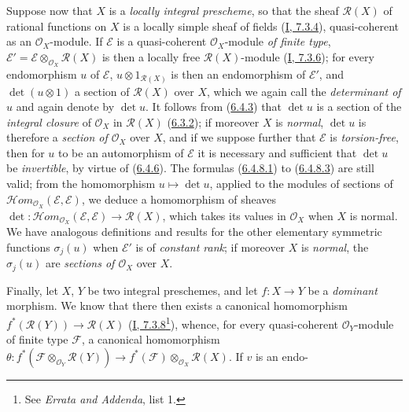 \begin{env}[6.4.9]
\label{II.6.4.9}
Suppose now that $X$ is a \emph{locally integral prescheme}, so that the
sheaf $\mathcal{R}(X)$ of rational functions on $X$ is a locally simple sheaf
of fields (\hyperref[I.7.3.4]{I, 7.3.4}), quasi-coherent as an
$\mathcal{O}_X$-module. If $\mathcal{E}$ is a quasi-coherent
$\mathcal{O}_X$-module \emph{of finite type},
$\mathcal{E}'=\mathcal{E}\otimes_{\mathcal{O}_X}\mathcal{R}(X)$ is then a
locally free $\mathcal{R}(X)$-module
(\hyperref[I.7.3.6]{I, 7.3.6}); for every endomorphism $u$ of
$\mathcal{E}$, $u\otimes1_{\mathcal{R}(X)}$ is then an endomorphism of
$\mathcal{E}'$, and $\det(u\otimes1)$ a section of $\mathcal{R}(X)$ over
$X$, which we again call the \emph{determinant of $u$} and again denote by
$\det u$. It follows from (\hyperref[II.6.4.3]{6.4.3}) that $\det u$ is
a section of the \emph{integral closure} of $\mathcal{O}_X$ in
$\mathcal{R}(X)$ (\hyperref[II.6.3.2]{6.3.2}); if moreover $X$ is
\emph{normal}, $\det u$ is therefore a \emph{section of $\mathcal{O}_X$}
over $X$, and if we suppose further that $\mathcal{E}$ is
\emph{torsion-free}, then for $u$ to be an automorphism of $\mathcal{E}$ it
is necessary and sufficient that $\det u$ be \emph{invertible}, by virtue of
(\hyperref[II.6.4.6]{6.4.6}). The formulas
(\hyperref[II.6.4.8.1]{6.4.8.1}) to
(\hyperref[II.6.4.8.3]{6.4.8.3}) are still valid; from the homomorphism
$u\mapsto\det u$, applied to the modules of sections of
$\mathcal{H}om_{\mathcal{O}_X}(\mathcal{E},\mathcal{E})$, we deduce a
homomorphism of sheaves
$\det:\mathcal{H}om_{\mathcal{O}_X}(\mathcal{E},\mathcal{E})
\to\mathcal{R}(X)$, which takes its values in $\mathcal{O}_X$ when $X$ is
normal. We have analogous definitions and results for the other elementary
symmetric functions $\sigma_j(u)$ when $\mathcal{E}'$ is of \emph{constant
rank}; if moreover $X$ is \emph{normal}, the $\sigma_j(u)$ are
\emph{sections of $\mathcal{O}_X$} over $X$.

Finally, let $X$, $Y$ be two integral preschemes, and let $f:X\to Y$ be a
\emph{dominant} morphism. We know that there then exists a canonical
homomorphism $f^*(\mathcal{R}(Y))\to\mathcal{R}(X)$
(\hyperref[I.7.3.8]{I, 7.3.8}\footnote{See \emph{Errata and Addenda},
list 1.}), whence, for every quasi-coherent $\mathcal{O}_Y$-module of
finite type $\mathcal{F}$, a canonical homomorphism
$\theta:f^*(\mathcal{F}\otimes_{\mathcal{O}_Y}\mathcal{R}(Y))
\to f^*(\mathcal{F})\otimes_{\mathcal{O}_X}\mathcal{R}(X)$. If $v$ is an
endo-



\end{env}
